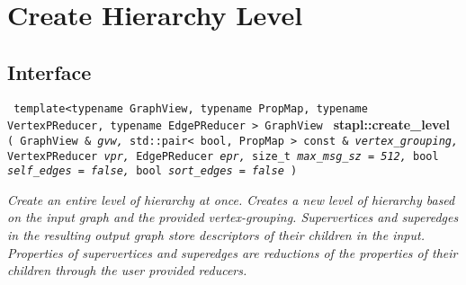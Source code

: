 
\section{ Create Hierarchy Level}
\label{sec-create-level-all-alg}

\subsection{Interface} \label{sec-create-level-all-alg-inter}

\noindent
\texttt{%
template<typename GraphView, typename PropMap, 
\newline
typename VertexPReducer, typename EdgePReducer >
\newline
GraphView 
}
\newline
\textbf{stapl::create\_level}%
\newline
\texttt{%
(
GraphView \&    
\textit{gvw,}%
std::pair< bool, PropMap > const \&
\textit{vertex\_grouping,}%
VertexPReducer
\textit{vpr,}%
EdgePReducer
\textit{epr,}%
size\_t
\textit{max\_msg\_sz = 512,}%
bool
\textit{self\_edges = false,}%
bool
\textit{sort\_edges = false}%
)    
}
\vspace{0.4cm}

\textit{
Create an entire level of hierarchy at once.  Creates a new level of hierarchy based on the input graph and the provided vertex-grouping. 
Supervertices and superedges in the resulting output graph store descriptors of their children in the input. 
Properties of supervertices and superedges are reductions of the properties of their children through the user provided reducers.
}
\vspace{0.4cm}

